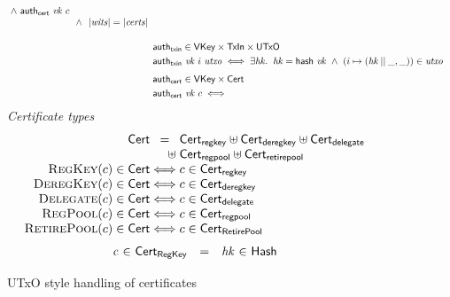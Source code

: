 \documentclass[11pt,a4paper]{article}
\begin{document}
\begin{figure}
\begin{align*}
\begin{array}[t]{@{}l@{~}r@{~}l}
             \and \fun{auth_{cert}} ~ \var{vk} ~ c \\
    & \and & \size{\var{wits}} = \size{\var{certs}}
  \end{array}
\\[1em]
& \fun{auth_{txin}}   \in \type{VKey} \times \type{TxIn} \times \type{UTxO} \\
& \fun{auth_{txin}} ~ \var{vk} ~ i ~ \var{utxo}
  \iff \exists \var{hk}. \;\; \var{hk} = \fun{hash}~ \var{vk}
  \and (i \mapsto (\var{hk} \mathbin{||} \_, \_)) \in \var{utxo}
\\[0.4em]
& \fun{auth_{cert}} \in \type{VKey} \times \type{Cert} \\
& \fun{auth_{cert}} ~ \var{vk} ~ c \iff 
\end{align*}
%
\emph{Certificate types}
%
\begin{equation*}
\begin{array}{r@{}c@{}l}
  \type{Cert} &=& \type{Cert_{regkey}} \uniondistinct
                \type{Cert_{deregkey}} \uniondistinct
                \type{Cert_{delegate}} \\
              &\hfill\uniondistinct\;&
                \type{Cert_{regpool}} \uniondistinct
                \type{Cert_{retirepool}} \\
  \textsc{RegKey}(c) \in \type{Cert} &\iff& c \in \type{Cert_{regkey}} \\
  \textsc{DeregKey}(c) \in \type{Cert} &\iff& c \in \type{Cert_{deregkey}} \\
  \textsc{Delegate}(c) \in \type{Cert} &\iff& c \in \type{Cert_{delegate}} \\
  \textsc{RegPool}(c) \in \type{Cert} &\iff& c \in \type{Cert_{regpool}} \\
  \textsc{RetirePool}(c) \in \type{Cert} &\iff& c \in \type{Cert_{RetirePool}} \\
\end{array}
\end{equation*}
%
\begin{equation*}
\begin{array}{r@{~\in~}l@{\quad=\quad}r@{~\in~}l}
  \var{c}
& \type{Cert_{RegKey}}
& \var{hk}
& \type{Hash}
\\
\end{array}
\end{equation*}

%
%
%
\caption{UTxO style handling of certificates}
\label{fig:utxo_style_certificates}
\end{figure}
\end{document}
